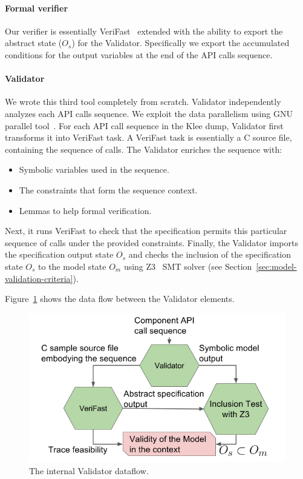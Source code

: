 \documentclass[letterpaper,twocolumn,10pt]{article}
\begin{document}
\paragraph{Formal verifier} Our verifier is essentially VeriFast~\cite{jacobs2008verifast} extended with the ability to export the abstract state (\(O_s\)) for the Validator. Specifically we export the accumulated conditions for the output variables at the end of the API calls sequence.

\paragraph{Validator} We wrote this third tool completely from scratch. Validator independently analyzes each API calls sequence. We exploit the data parallelism using GNU parallel tool~\cite{Tange2011a}. For each API call sequence in the Klee dump, Validator first transforms it into VeriFast task. A VeriFast task is essentially a C source file, containing the sequence of calls. The Validator enriches the sequence with:
\begin{itemize}
    \item Symbolic variables used in the sequence.
    \item The constraints that form the sequence context.
    \item Lemmas to help formal verification.
\end{itemize}
Next, it runs VeriFast to check that the specification permits this particular sequence of calls under the provided constraints. Finally, the Validator imports the specification output state \(O_s\) and checks the inclusion of the specification state \(O_s\) to the model state \(O_m\) using Z3~\cite{de2008z3} SMT solver (see Section~\ref{sec:model-validation-criteria}).

Figure~\ref{fig:validator} shows the data flow between the Validator elements.

\begin{figure}[h]
    \includegraphics[width=\columnwidth]{figures/validator.png}
    \caption{The internal Validator dataflow.}
    \label{fig:validator}
\end{figure}
\end{document}
